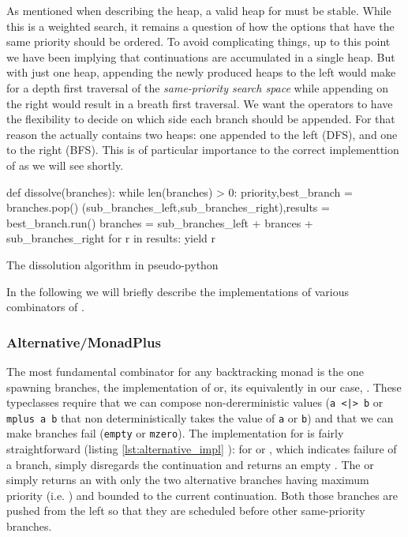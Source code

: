 As mentioned when describing the heap, a valid heap for 
must be stable. While this is a weighted search, it remains a question
of how the options that have the same priority should be ordered.  To
avoid complicating things, up to this point we have been implying that
continuations are accumulated in a single heap. But with just one
heap, appending the newly produced heaps to the left would make for a
depth first traversal of the \emph{same-priority search space} while
appending on the right would result in a breath first traversal. We
want the operators to have the flexibility to decide on which side
each branch should be appended. For that reason the 
actually contains two heaps: one appended to the left (DFS), and one
to the right (BFS). This is of particular importance to the correct
implementtion of \hask{<//>} as we will see shortly.

\begin{code}
\begin{pycode}
def dissolve(branches):
    while len(branches) > 0:
        priority,best_branch = branches.pop()
        (sub_branches_left,sub_branches_right),results = best_branch.run()
        branches = sub_branches_left + brances + sub_branches_right
        for r in results:
            yield r
\end{pycode}
  \caption{\label{lst:dissovle_algo}The dissolution algorithm in
    pseudo-python}
\end{code}


In the following we will briefly describe the implementations of
various combinators of .

\subsubsection{Alternative/MonadPlus}

The most fundamental combinator for any backtracking monad is the one
spawning branches, the implementation of  or, its
equivalently in our case, . These typeclasses require
that we can compose non-dererministic values (\texttt{a <|> b} or
\texttt{mplus a b} that non deterministically takes the value of
\texttt{a} or \texttt{b}) and that we can make branches fail
(\texttt{empty} or \texttt{mzero}). The implementation for
 is fairly straightforward (listing
\ref{lst:alternative_impl} ): for  or , which
indicates failure of a branch, simply disregards the continuation and
returns an empty . The  or \hask{<|>} simply
returns an  with only the two alternative branches having
maximum priority (i.e. ) and bounded to the
current continuation. Both those branches are pushed from the left so
that they are scheduled before other same-priority branches.

